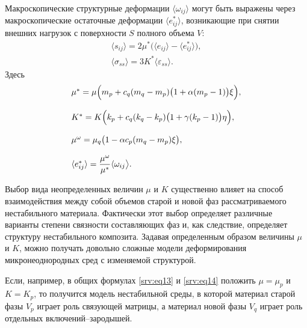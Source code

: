 Макроскопические структурные деформации $ \langle  {\omega_{ij}}  \rangle $ могут быть выражены через макроскопические остаточные деформации  $ \langle  {e^{*}_{ij}}  \rangle $, возникающие при снятии внешних нагрузок с поверхности $S$ полного объема $V$:  
\begin{equation}\label{srv:eq13}
\begin{array}{ll}
 \langle  {s_{ij}}  \rangle =2\mu^{*}\bigl( \langle  {e_{ij}}  \rangle - \langle  {e^{*}_{ij}}  \rangle \bigr),\\[2mm]
 \langle  {\sigma_{ss}}  \rangle =3 K^{*} \langle  {\varepsilon_{ss}}  \rangle .
\end{array}
\end{equation}
Здесь
\begin{equation}\label{srv:eq14}
\begin{array}{ll}
\mu^{*}=\mu\Bigl(m_{p}+c_{q} (m_{q}-m_{p} ) \bigl(1+\alpha (m_{p}-1 ) \bigr) \xi\Bigr),\\
\\
K^{*}=K\Bigl(k_{p}+c_{q}  (k_{q}-k_{p} ) \bigl(1+\gamma (k_{p}-1 ) \bigr) \eta \Bigr),\\
\\
\mu^{\omega}=\mu_{q} \bigl (1-\alpha c_{p} (m_{q}-m_{p} ) \xi \bigr),\\
\\
 \langle  {e^{*}_{ij}}  \rangle =\dfrac{\mu^{\omega}}{\mu^{*}}  \langle  {\omega_{ij}} \big \rangle.
\end{array}
\end{equation}

Выбор вида неопределенных величин  $\mu$  и $K$ существенно влияет на способ взаимодействия между собой объемов старой и новой фаз рассматриваемого нестабильного материала. Фактически этот выбор определяет различные варианты степени связности составляющих фаз и, как следствие, определяет структуру нестабильного композита. Задавая определенным образом величины  $\mu$  и $K$, можно получать довольно сложные модели деформирования микронеоднородных сред с изменяемой структурой. 

Если, например, в общих формулах \eqref{srv:eq13} и \eqref{srv:eq14} положить $\mu=\mu_{p}$  и $K=K_{p}$, то получится модель нестабильной среды, в которой материал старой фазы $V_{p}$ играет роль связующей матрицы, а материал новой фазы $V_{q}$ играет роль отдельных включений--зародышей.

